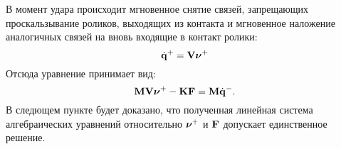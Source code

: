 В момент удара происходит мгновенное снятие связей, запрещающих проскальзывание роликов, выходящих из контакта и мгновенное наложение аналогичных связей на вновь входящие в контакт ролики:
\begin{equation*}
\dot{\mathbf{q}}^+ = \mathbf{V}\boldsymbol{\mathbf{\nu}}^+
\end{equation*}
Отсюда уравнение  принимает вид:
\begin{equation}\label{eq:udar_mat}
\mathbf{M}\mathbf{V}\boldsymbol{\mathbf{\nu}}^+ - \mathbf{K}\mathbf{F} = \mathbf{M}\dot{\mathbf{q}}^-.
\end{equation}
В следющем пункте будет доказано, что полученная линейная система алгебраических уравнений относительно $\boldsymbol{\mathbf{\nu}}^+$ и $\mathbf{F}$ допускает единственное решение.


